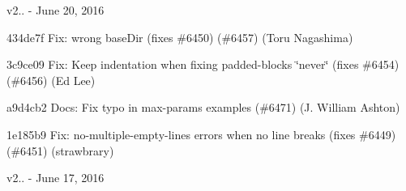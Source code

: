 v2.. -\/ June 20, 2016


\begin{DoxyItemize}
\item 434de7f Fix\+: wrong base\+Dir (fixes \#6450) (\#6457) (Toru Nagashima)
\item 3c9ce09 Fix\+: Keep indentation when fixing {\ttfamily padded-\/blocks} \char`\"{}never\char`\"{} (fixes \#6454) (\#6456) (Ed Lee)
\item a9d4cb2 Docs\+: Fix typo in max-\/params examples (\#6471) (J. William Ashton)
\item 1e185b9 Fix\+: no-\/multiple-\/empty-\/lines errors when no line breaks (fixes \#6449) (\#6451) (strawbrary)
\end{DoxyItemize}

v2.. -\/ June 17, 2016


